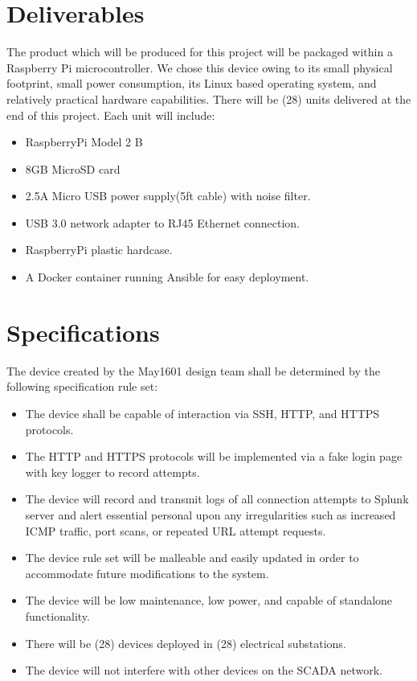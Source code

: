 \section{Deliverables}

The product which will be produced for this project will be packaged within a Raspberry Pi microcontroller. We chose this device owing to its small physical footprint, small power consumption, its Linux based operating system, and relatively practical hardware capabilities. There will be (28) units delivered at the end of this project. Each unit will include:

\begin{itemize} 
\item RaspberryPi Model 2 B
\item 8GB MicroSD card
\item 2.5A Micro USB power supply(5ft cable) with noise filter.
\item USB 3.0 network adapter to RJ45 Ethernet connection.
\item RaspberryPi plastic hardcase.
\item A Docker container running Ansible for easy deployment.
\end{itemize}

\section{Specifications}

The device created by the May1601 design team shall be determined by the following specification rule set:

\begin{itemize} 
\item The device shall be capable of interaction via SSH, HTTP, and HTTPS protocols.
\item The HTTP and HTTPS protocols will be implemented via a fake login page with key logger to record attempts.
\item The device will record and transmit logs of all connection attempts to Splunk server and alert essential personal upon any irregularities such as increased ICMP traffic, port scans, or repeated URL attempt requests. 
\item The device rule set will be malleable and easily updated in order to accommodate future modifications to the system.
\item The device will be low maintenance, low power, and capable of standalone functionality. 
\item There will be (28) devices deployed in (28) electrical substations. 
\item The device will not interfere with other devices on the SCADA network.
\end{itemize}

